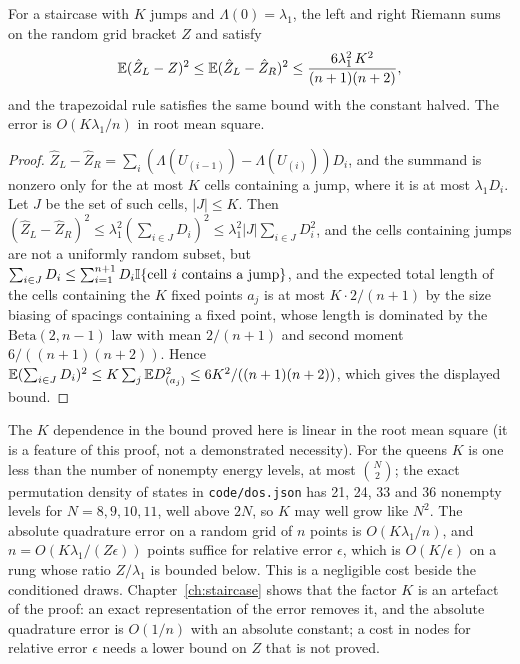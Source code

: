 \begin{theorem}
\label{thm:staircasebracket}
For a staircase with $K$ jumps and $\Lambda(0) = \lambda_1$, the left and right Riemann sums on the random grid bracket $Z$ and satisfy
\[
\mathbb{E} (\hat Z_L - Z)^2 \le \mathbb{E} (\hat Z_L - \hat Z_R)^2 \le \frac{6 \lambda_1^2 \, K^2}{(n+1)(n+2)} ,
\]
and the trapezoidal rule satisfies the same bound with the constant halved. The error is $O(K \lambda_1 / n)$ in root mean square.
\end{theorem}

\begin{proof}
$\hat Z_L - \hat Z_R = \sum_i (\Lambda(U_{(i-1)}) - \Lambda(U_{(i)})) D_i$, and the summand is nonzero only for the at most $K$ cells containing a jump, where it is at most $\lambda_1 D_i$. Let $J$ be the set of such cells, $|J| \le K$. Then $(\hat Z_L - \hat Z_R)^2 \le \lambda_1^2 (\sum_{i \in J} D_i)^2 \le \lambda_1^2 |J| \sum_{i \in J} D_i^2$, and the cells containing jumps are not a uniformly random subset, but $\sum_{i \in J} D_i \le \sum_{i=1}^{n+1} D_i \mathbb{I}\{ \text{cell } i \text{ contains a jump} \}$, and the expected total length of the cells containing the $K$ fixed points $a_j$ is at most $K \cdot 2/(n+1)$ by the size biasing of spacings containing a fixed point, whose length is dominated by the $\mathrm{Beta}(2, n-1)$ law with mean $2/(n+1)$ and second moment $6/((n+1)(n+2))$. Hence $\mathbb{E} (\sum_{i \in J} D_i)^2 \le K \sum_j \mathbb{E} D_{(a_j)}^2 \le 6 K^2 / ((n+1)(n+2))$, which gives the displayed bound.
\end{proof}

The $K$ dependence in the bound proved here is linear in the root mean square (it is a feature of this proof, not a demonstrated necessity). For the queens $K$ is one less than the number of nonempty energy levels, at most $\binom{N}{2}$; the exact permutation density of states in \texttt{code/dos.json} has 21, 24, 33 and 36 nonempty levels for $N = 8, 9, 10, 11$, well above $2N$, so $K$ may well grow like $N^2$. The absolute quadrature error on a random grid of $n$ points is $O(K \lambda_1 / n)$, and $n = O(K \lambda_1 / (Z \epsilon))$ points suffice for relative error $\epsilon$, which is $O(K / \epsilon)$ on a rung whose ratio $Z / \lambda_1$ is bounded below. This is a negligible cost beside the conditioned draws. Chapter~\ref{ch:staircase} shows that the factor $K$ is an artefact of the proof: an exact representation of the error removes it, and the absolute quadrature error is $O(1/n)$ with an absolute constant; a cost in nodes for relative error $\epsilon$ needs a lower bound on $Z$ that is not proved.

